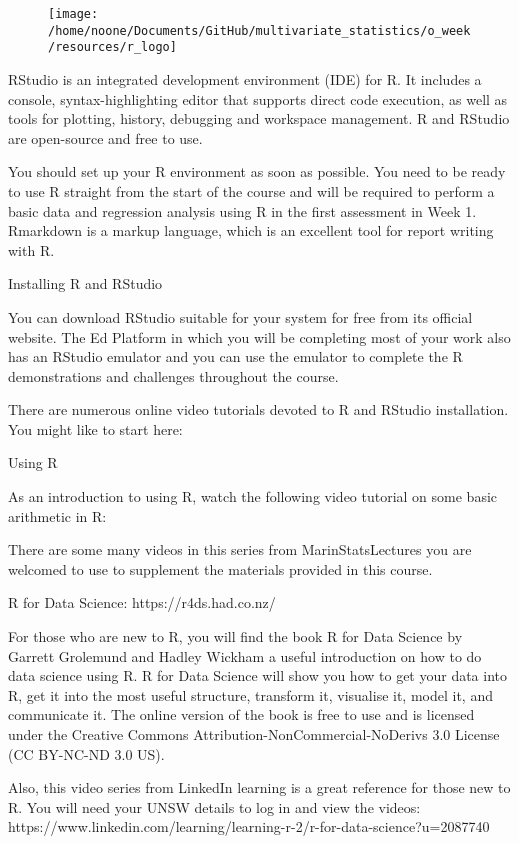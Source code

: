 \documentclass[11pt]{article}
\begin{document}
\begin{figure}
    \centering
    \texttt{[image: /home/noone/Documents/GitHub/multivariate\_statistics/o\_week/resources/r\_logo]}
    \caption{}
    \label{fig:}
\end{figure}

RStudio is an integrated development environment (IDE) for R. It includes a
console, syntax-highlighting editor that supports direct code execution, as
well as tools for plotting, history, debugging and workspace management.
R and RStudio are open-source and free to use.

You should set up your R environment as soon as possible.
You need to be ready to use R straight from the start of the course and will be
required to perform a basic data and regression analysis using R in the first
assessment in Week 1.
Rmarkdown is a markup language, which is an excellent tool for report writing
with R.

Installing R and RStudio

You can download RStudio suitable for your system for free from its official
website.
The Ed Platform in which you will be completing most of your work also has an
RStudio emulator and you can use the emulator to complete the R demonstrations
and challenges throughout the course.

There are numerous online video tutorials devoted to R and RStudio installation.
You might like to start here:

Using R

As an introduction to using R, watch the following video tutorial on some basic
arithmetic in R:

There are some many videos in this series from MarinStatsLectures you are
welcomed to use to supplement the materials provided in this course.

R for Data Science: https://r4ds.had.co.nz/

For those who are new to R, you will find the book R for Data Science by Garrett
Grolemund and Hadley Wickham a useful introduction on how to do data science
using R.
R for Data Science will show you how to get your data into R, get it into the
most useful structure, transform it, visualise it, model it, and communicate it.
The online version of the book is free to use and is licensed under the
Creative Commons Attribution-NonCommercial-NoDerivs 3.0 License
(CC BY-NC-ND 3.0 US).

Also, this video series from LinkedIn learning is a great reference for those
new to R. You will need your UNSW details to log in and view the videos:
https://www.linkedin.com/learning/learning-r-2/r-for-data-science?u=2087740
\end{document}
